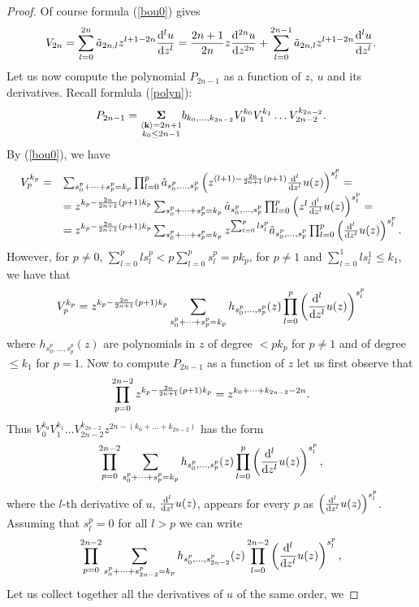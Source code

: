 \documentclass{amsart}
\theoremstyle{definition}
\theoremstyle{remark}
\theoremstyle{remark}
\begin{document}
\begin{proof}
Of course formula (\ref{bou0}) gives
$$
V_{2n}= \sum_{l=0}^{2n}\tilde a_{2n,l}z^{l+1-2n}
{{\rm d}^l u\over{\rm d} z^l}=
{2n+1\over 2n} z {{\rm d}^{2n}u\over{\rm d} z^{2n}} +
\sum_{l=0}^{2n-1}\tilde a_{2n,l}z^{l+1-2n}
{{\rm d}^l u \over{\rm d} z^l}.
$$
Let us now compute the polynomial $P_{2n-1}$ as a function of $z$, $u$
and its derivatives. Recall formlula (\ref{polyn}):
$$
P_{2n-1}=
\underset{{\overset{
\scriptstyle \langle{\bf k}\rangle=2n+1}{\scriptstyle k_0\leq 2n-1}}}
{{\boldsymbol{\Sigma}}}
b_{k_0,\dots,k_{2n-2}} V_0^{k_0} V_1^{k_1}\dots
V_{2n-2}^{k_{2n-2}}.
$$
By (\ref{bou0}), we have
$$
\begin{array}{ll}
V_p^{k_{p}} =& \sum_{s_0^p+\dots+s_p^p=k_p}
\prod^p_{l=0}\hat a_{s_0^p,\dots,s_p^p}
\left(z^{(l+1)-{2n\over 2n+1}(p+1)}
{{\rm d}^l\over{\rm d} z^l} u(z)\right)^{s_l^p}=\\
&=z^{k_p-{2n\over 2n+1}(p+1)k_p} \sum_{s_0^p+\dots+s_p^p=k_p}
\hat a_{s_0^p,\dots,s_p^p} \prod^p_{l=0}
\left(z^{l}{{\rm d}^l\over{\rm d} z^l} u(z)\right)^{s_l^p}=\\
&= z^{k_p-{2n\over 2n+1}(p+1)k_p} \sum_{s_0^p+\dots+s_p^p=k_p}
z^{\sum_{l=0}^p l s_l^p}
\hat a_{s_0^p,\dots,s_p^p} \prod^p_{l=0}
\left({{\rm d}^l\over{\rm d} z^l} u(z)\right)^{s_l^p}.\\
\end{array}
$$
However, for $p\not=0$,
$\sum_{l=0}^p l s_l^p< p \sum_{l=0}^p s_l^p=p k_p$, for $p\neq1$ and
$\sum_{l=0}^1 l s_l^1\leq k_1$, we have that
$$
V_p^{k_{p}} = z^{k_p-{2n\over 2n+1}(p+1)k_p}
\sum_{s_0^p+\dots+s_p^p=k_p}
h_{s_0^p,\dots,s_p^p}(z) \prod^p_{l=0}
\left({{\rm d}^l\over{\rm d} z^l} u(z)\right)^{s_l^p}
$$
where $h_{s_0^p,\dots,s_p^p}(z)$ are polynomials in $z$ of degree
$< p k_p$ for $p\neq1$ and of degree $\leq k_1$ for $p=1$. Now to compute
$P_{2n-1}$ as a function of $z$ let us first observe that
$$
\prod_{p=0}^{2n-2}
z^{k_p-{2n\over 2n+1}(p+1)k_p}= z^{k_0+\dots+k_{2n-2}-2n}.
$$
Thus $V_0^{k_0} V_1^{k_1}\dots V_{2n-2}^{k_{2n-2}}
z^{2n-(k_0+\dots+k_{2n-2})}$ has the form
$$
\prod_{p=0}^{2n-2}\sum_{s_0^p+\dots+s_p^p=k_p}
h_{s_0^p,\dots,s_p^p}(z) \prod^p_{l=0}
\left({{\rm d}^l\over{\rm d} z^l} u(z)\right)^{s_l^p},
$$
where the $l$-th derivative of $u$, ${{\rm d}^l\over{\rm d} z^l}u(z)$,
appears for every $p$ as
$\left({{\rm d}^l\over{\rm d} z^l} u(z)\right)^{s_l^p}$. Assuming that
$s_l^p=0$ for all $l>p$ we can write
$$
\prod_{p=0}^{2n-2}\sum_{s_0^p+\dots+s_{2n-2}^p=k_p}
h_{s_0^p,\dots,s_{2n-2}^p}(z) \prod^{2n-2}_{l=0}
\left({{\rm d}^l\over{\rm d} z^l} u(z)\right)^{s_l^p},
$$
Let us
collect together all the derivatives of $u$ of the same order, we

\end{proof}
\end{document}
